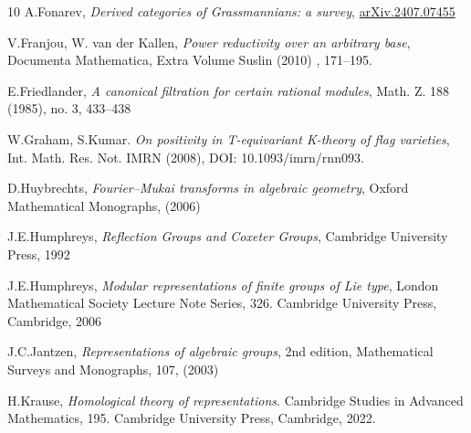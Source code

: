 \documentclass[sn-mathphys-num]{sn-jnl}%
\theoremstyle{definition}
\begin{document}
\begin{thebibliography}{10}
A.Fonarev, {\it Derived categories of Grassmannians: a survey}, 
\href{https://doi.org/10.48550/arXiv.2407.07455}{arXiv.2407.07455}

V.Franjou, W. van der Kallen, 
{\it Power reductivity over an arbitrary base}, 
Documenta Mathematica, Extra Volume Suslin (2010) , 171--195.

E.Friedlander, {\it A canonical filtration for certain rational modules}, Math. Z. 188 (1985), no. 3, 433--438

W.Graham, S.Kumar. {\it On positivity in T-equivariant K-theory of flag varieties}, Int. Math. Res. Not. IMRN (2008),  DOI: 10.1093/imrn/rnn093.


D.Huybrechts, {\it Fourier--Mukai transforms in algebraic geometry},
Oxford Mathematical Monographs,  (2006)

J.E.Humphreys, {\it Reflection Groups and Coxeter Groups}, Cambridge University Press, 1992 

J.E.Humphreys, {\it Modular representations of finite groups of Lie type}, London Mathematical Society Lecture Note Series, 326. Cambridge University Press, Cambridge, 2006

J.C.Jantzen, {\it Representations of algebraic groups}, 2nd edition, Mathematical Surveys and Monographs, 107, (2003)





H.Krause, {\it Homological theory of representations}. Cambridge Studies in Advanced Mathematics, 195. Cambridge University Press, Cambridge, 2022.


\end{thebibliography}
\end{document}
